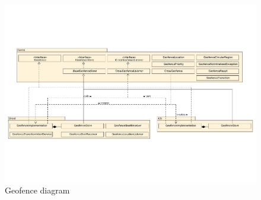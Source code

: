 \documentclass[12pt]{article}
\begin{document}
	\begin{figure}[ht]
		\centering
		\includegraphics[width=\textheight,keepaspectratio=true,angle=90]{../../../img/GeofenceDiagram.pdf}
  		\caption{Geofence diagram\label{fig:geofence}}
	\end{figure}
\end{document}
